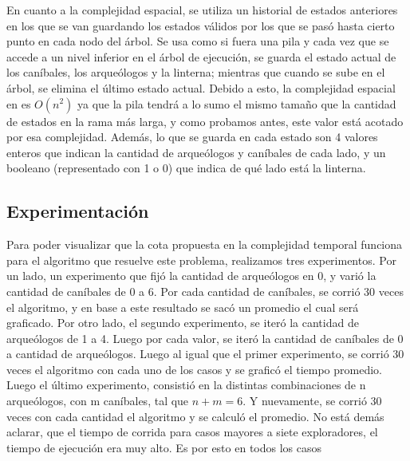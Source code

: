       En cuanto a la complejidad espacial, se utiliza un historial de estados anteriores en los que se van guardando los estados válidos por los que se pasó hasta cierto punto en cada nodo del árbol. Se usa como si fuera una pila y cada vez que se accede a un nivel inferior en el árbol de ejecución, se guarda el estado actual de los caníbales, los arqueólogos y la linterna; mientras que cuando se sube en el árbol, se elimina el último estado actual. Debido a esto, la complejidad espacial en es $O(n^2)$ ya que la pila tendrá a lo sumo el mismo tamaño que la cantidad de estados en la rama más larga, y como probamos antes, este valor está acotado por esa complejidad. Además, lo que se guarda en cada estado son 4 valores enteros que indican la cantidad de arqueólogos y caníbales de cada lado, y un booleano (representado con 1 o 0) que indica de qué lado está la linterna.



    \subsection{Experimentación}

	Para poder visualizar que la cota propuesta en la complejidad temporal funciona para el algoritmo que resuelve este problema, realizamos tres experimentos. Por un lado, un experimento que fijó la cantidad de arqueólogos en 0, y varió la cantidad de caníbales de 0 a 6. Por cada cantidad de caníbales, se corrió 30 veces el algoritmo, y en base a este resultado se sacó un promedio el cual será graficado. Por otro lado,  el segundo experimento, se iteró la cantidad de arqueólogos de 1 a 4. Luego por cada valor, se iteró la cantidad de caníbales de 0 a cantidad de arqueólogos. Luego al igual que el primer experimento, se corrió 30 veces el algoritmo con cada uno de los casos y se graficó el tiempo promedio. Luego el último experimento, consistió en la distintas combinaciones de n arqueólogos, con m caníbales, tal que $n+m = 6$. Y nuevamente, se corrió 30 veces con cada cantidad el algoritmo y se calculó el promedio.
	No está demás aclarar, que el tiempo de corrida para casos mayores a siete exploradores, el tiempo de ejecución era muy alto. Es por esto en todos los casos

